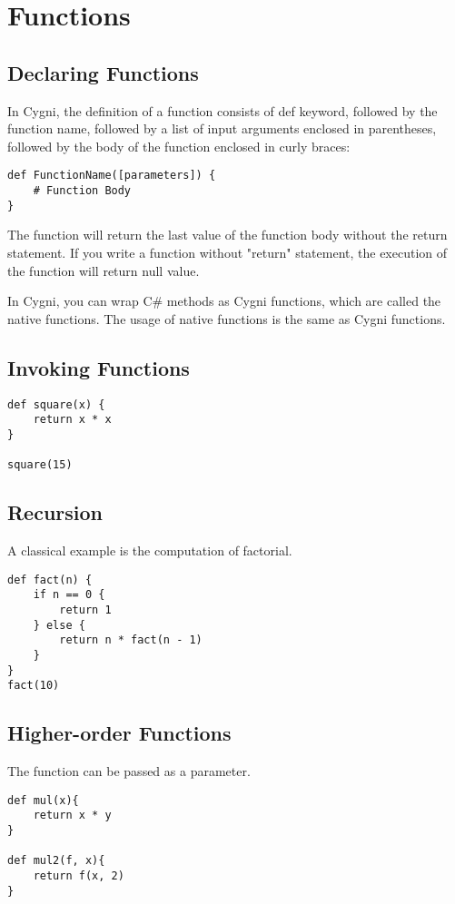 \chapter{Functions}
\section{Declaring Functions}
In Cygni, the definition of a function consists of def keyword, 
followed by the function name, 
followed by a list of input arguments enclosed in parentheses, 
followed by the body of the function enclosed in curly braces:

\begin{lstlisting}
def FunctionName([parameters]) {
	# Function Body
}
\end{lstlisting}
The function will return the last value of the function body without the return statement. If you write a function without "return" statement, the execution of the function will return null value.

In Cygni, you can wrap C\# methods as Cygni functions, which are called the native functions. The usage of native functions is the same as Cygni functions.
\section{Invoking Functions}
\begin{lstlisting}
def square(x) {
	return x * x
}

square(15)
\end{lstlisting}

\section{Recursion}
A classical example is the computation of factorial.
\begin{lstlisting}
def fact(n) {
	if n == 0 {
		return 1
	} else {
		return n * fact(n - 1)
	}
}
fact(10)
\end{lstlisting}
\section{Higher-order Functions}
The function can be passed as a parameter. 
\begin{lstlisting}
def mul(x){
	return x * y
}

def mul2(f, x){
	return f(x, 2)
}
\end{lstlisting}
